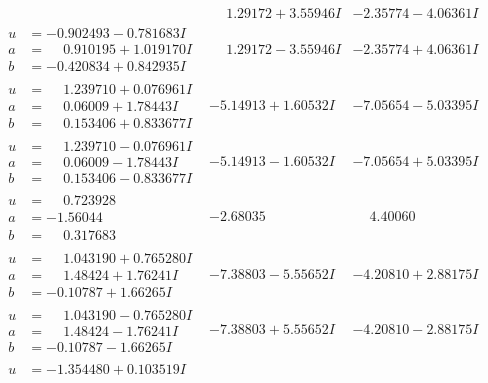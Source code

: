 \documentclass[1p]{elsarticle_modified}
\theoremstyle{definition}
\begin{document}
$$\begin{array}{c|c|c}
 & \phantom{-}1.29172 + 3.55946 I & -2.35774 - 4.06361 I \\ \hline\begin{aligned}
u &= -0.902493 - 0.781683 I \\
a &= \phantom{-}0.910195 + 1.019170 I \\
b &= -0.420834 + 0.842935 I\end{aligned}
 & \phantom{-}1.29172 - 3.55946 I & -2.35774 + 4.06361 I \\ \hline\begin{aligned}
u &= \phantom{-}1.239710 + 0.076961 I \\
a &= \phantom{-}0.06009 + 1.78443 I \\
b &= \phantom{-}0.153406 + 0.833677 I\end{aligned}
 & -5.14913 + 1.60532 I & -7.05654 - 5.03395 I \\ \hline\begin{aligned}
u &= \phantom{-}1.239710 - 0.076961 I \\
a &= \phantom{-}0.06009 - 1.78443 I \\
b &= \phantom{-}0.153406 - 0.833677 I\end{aligned}
 & -5.14913 - 1.60532 I & -7.05654 + 5.03395 I \\ \hline\begin{aligned}
u &= \phantom{-}0.723928\phantom{ +0.000000I} \\
a &= -1.56044\phantom{ +0.000000I} \\
b &= \phantom{-}0.317683\phantom{ +0.000000I}\end{aligned}
 & -2.68035\phantom{ +0.000000I} & \phantom{-}4.40060\phantom{ +0.000000I} \\ \hline\begin{aligned}
u &= \phantom{-}1.043190 + 0.765280 I \\
a &= \phantom{-}1.48424 + 1.76241 I \\
b &= -0.10787 + 1.66265 I\end{aligned}
 & -7.38803 - 5.55652 I & -4.20810 + 2.88175 I \\ \hline\begin{aligned}
u &= \phantom{-}1.043190 - 0.765280 I \\
a &= \phantom{-}1.48424 - 1.76241 I \\
b &= -0.10787 - 1.66265 I\end{aligned}
 & -7.38803 + 5.55652 I & -4.20810 - 2.88175 I \\ \hline\begin{aligned}
u &= -1.354480 + 0.103519 I \\

\end{aligned}
\end{array}$$
\end{document}
